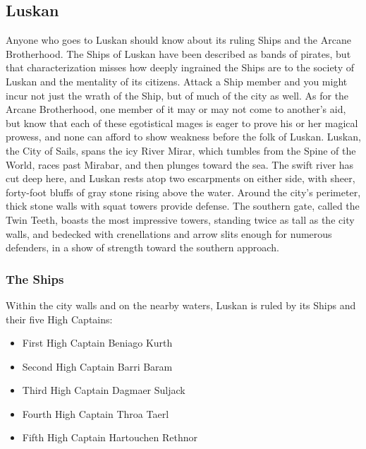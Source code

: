 \documentclass[10pt,a4paper,twoside,twocolumn,openany,bg=print,nodeprecatedcode]{dndbook}
\begin{document}
\subsection{Luskan}
Anyone who goes to Luskan should know about its ruling Ships and the Arcane Brotherhood. The Ships of Luskan have been described as bands of pirates, but that characterization misses how deeply ingrained the Ships are to the society of Luskan and the mentality of its citizens. Attack a Ship member and you might incur not just the wrath of the Ship, but of much of the city as well. As for the Arcane Brotherhood, one member of it may or may not come to another's aid, but know that each of these egotistical mages is eager to prove his or her magical prowess, and none can afford to show weakness before the folk of Luskan.
Luskan, the City of Sails, spans the icy River Mirar, which tumbles from the Spine of the World, races past Mirabar, and then plunges toward the sea. The swift river has cut deep here, and Luskan rests atop two escarpments on either side, with sheer, forty-foot bluffs of gray stone rising above the water. Around the city's perimeter, thick stone walls with squat towers provide defense. The southern gate, called the Twin Teeth, boasts the most impressive towers, standing twice as tall as the city walls, and bedecked with crenellations and arrow slits enough for numerous defenders, in a show of strength toward the southern approach.
\subsubsection{The Ships}
Within the city walls and on the nearby waters, Luskan is ruled by its Ships and their five High Captains:

\begin{itemize}
\item First High Captain Beniago Kurth
\item Second High Captain Barri Baram
\item Third High Captain Dagmaer Suljack
\item Fourth High Captain Throa Taerl
\item Fifth High Captain Hartouchen Rethnor
\end{itemize}
\end{document}
